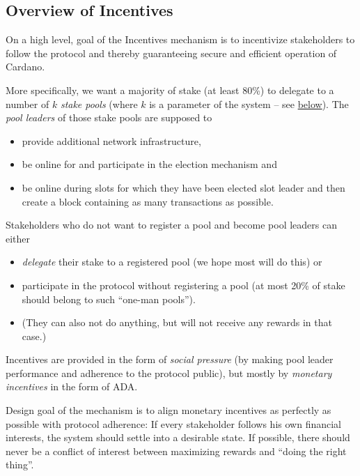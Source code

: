 \documentclass[11pt,a4paper]{article}
\begin{document}

\subsection{Overview of Incentives}\label{overview-of-incentives}

On a high level, goal of the Incentives mechanism is to incentivize
stakeholders to follow the protocol and thereby guaranteeing secure and
efficient operation of Cardano.

More specifically, we want a majority of stake (at least 80\%) to
delegate to a number of \(k\) \emph{stake pools} (where \(k\) is a
parameter of the system -- see \hyperref[parameters]{below}). The
\emph{pool leaders} of those stake pools are supposed to

\begin{itemize}
\item
  provide additional network infrastructure,
\item
  be online for and participate in the election mechanism and
\item
  be online during slots for which they have been elected slot leader
  and then create a block containing as many transactions as possible.
\end{itemize}

Stakeholders who do not want to register a pool and become pool leaders
can either

\begin{itemize}
\item
  \emph{delegate} their stake to a registered pool (we hope most will do
  this) or
\item
  participate in the protocol without registering a pool (at most 20\%
  of stake should belong to such ``one-man pools'').
\item
  (They can also not do anything, but will not receive any rewards in
  that case.)
\end{itemize}

Incentives are provided in the form of \emph{social pressure} (by making
pool leader performance and adherence to the protocol public), but
mostly by \emph{monetary incentives} in the form of ADA.

Design goal of the mechanism is to align monetary incentives as
perfectly as possible with protocol adherence: If every stakeholder
follows his own financial interests, the system should settle into a
desirable state. If possible, there should never be a conflict of
interest between maximizing rewards and ``doing the right thing''.
\end{document}
